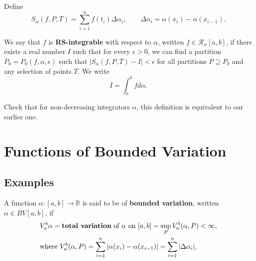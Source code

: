\documentclass[letterpaper, reqno,11pt]{article}
\newcommand{\RR}{\mathbb{R}}
\begin{document}
\begin{defn}
  Define
  $$ S_\alpha(f, P, T) = \sum_{i = 1}^n f(t_i) \Delta \alpha_i, \qquad \Delta \alpha_i = \alpha(x_i) - \alpha(x_{i - 1}). $$

  \begin{figure}[H]
    \centering
  \end{figure}

  We say that $f$ is {\bf RS-integrable} with respect to $\alpha$, written $f \in \mathcal R_\alpha[a, b]$, if there exists a real number $I$ such that for every $\epsilon > 0$, we can find a partition $P_0 = P_0(f, \alpha, \epsilon)$ such that $|S_\alpha(f, P, T) - I| < \epsilon$ for all partitions $P \supseteq P_0$ and any selection of points $T$. We write
  $$ I = \int_a^b fd\alpha. $$
\end{defn}

 Check that for non-decreasing integrators $\alpha$, this definition is equivalent to our earlier one.

\section{Functions of Bounded Variation}

\subsection{Examples}

 A function $\alpha : [a, b] \to \RR$ is said to be of {\bf bounded variation}, written $\alpha \in BV[a, b]$, if
\begin{align*}
  & V_a^b \alpha = \text{{\bf total variation} of $\alpha$ on $[a, b]$} = \sup_P V_a^b (\alpha, P) < \infty, \\
  & \text{where } V_a^b(\alpha, P) = \sum_{i = 1}^n |\alpha(x_i) - \alpha(x_{i - 1})| = \sum_{i = 1}^n |\Delta \alpha_i|.
\end{align*}
\end{document}
